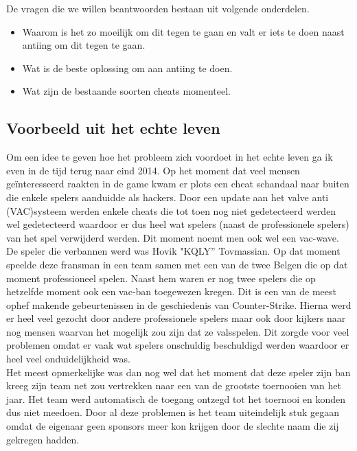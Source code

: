 \documentclass[pdftex,a4paper,12pt,twoside]{report}
\begin{document}
De vragen die we willen beantwoorden bestaan uit volgende onderdelen.
\begin{itemize}
\item Waarom is het zo moeilijk om dit tegen te gaan en valt er iets te doen naast \gls{anti}ing om dit tegen te gaan.
\item Wat is de beste oplossing om aan \gls{anti}ing te doen.
\item Wat zijn de bestaande soorten \gls{cheat}s momenteel. 
\end{itemize}


\subsection{Voorbeeld uit het echte leven}
\label{subsec:voorbeeld}

Om een idee te geven hoe het probleem zich voordoet in het echte leven ga ik even in de tijd terug naar eind 2014. Op het moment dat veel mensen geïnteresseerd raakten in de game kwam er plots een \gls{cheat} schandaal naar buiten die enkele spelers aanduidde als hackers. Door een update aan het \gls{valve} \gls{anti} (VAC)systeem werden enkele \gls{cheat}s die tot toen nog niet gedetecteerd werden wel gedetecteerd waardoor er dus heel wat spelers (naast de professionele spelers) van het spel verwijderd werden. Dit moment noemt men ook wel een \gls{vac}-wave.
\\

De speler die verbannen werd was Hovik "KQLY'' Tovmassian. Op dat moment speelde deze fransman in een team samen met een van de twee Belgen die op dat moment professioneel spelen. Naast hem waren er nog twee spelers die op hetzelfde moment ook een \gls{vac}-ban toegewezen kregen. Dit is een van de meest ophef makende gebeurtenissen in de geschiedenis van Counter-Strike. Hierna werd er heel veel gezocht door andere professionele spelers maar ook door kijkers naar nog mensen waarvan het mogelijk zou zijn dat ze valsspelen. Dit zorgde voor veel problemen omdat er vaak wat spelers onschuldig beschuldigd werden waardoor er heel veel onduidelijkheid was.\citep{pcgamerhackingscandal}
\\

Het meest opmerkelijke was dan nog wel dat het moment dat deze speler zijn ban kreeg zijn team net zou vertrekken naar een van de grootste toernooien van het jaar. Het team werd automatisch de toegang ontzegd tot het toernooi en konden dus niet meedoen. Door al deze problemen is het team uiteindelijk stuk gegaan omdat de eigenaar geen sponsors meer kon krijgen door de slechte naam die zij gekregen hadden. \citep{titan}
\\
\end{document}
